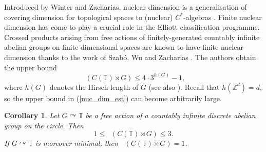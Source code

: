 \documentclass[11pt,a4paper,leqno]{amsart}
\newtheorem{cor}[thm]{Corollary}
\theoremstyle{definition}
\theoremstyle{remark}
\numberwithin{equation}{section}
\theoremstyle{plain}
\DeclareMathOperator{\nucdim}{\dim_{\operatorname{nuc}}}
\newcommand{\Zb}{\mathbb{Z}}
\newcommand{\Tb}{\mathbb{T}}
\begin{document}
Introduced by Winter and Zacharias, nuclear dimension is a generalisation of covering dimension for topological spaces to (nuclear) $C^*$-algebras \cite{WinZac10}. Finite nuclear dimension has come to play a crucial role in the Elliott classification programme. Crossed products arising from free actions of finitely-generated countably infinite abelian groups on finite-dimensional spaces are known to have finite nuclear dimension thanks to the work of Szab\'o, Wu and Zacharias \cite[Corollary 8.6]{SzaWuZac19}. The authors obtain the upper bound 
\begin{equation}
    \nucdim(C(\Tb)\rtimes G) \le 4\cdot 3^{h(G)} - 1, \label{nuc_dim_est}
\end{equation}
where $h(G)$ denotes the Hirsch length of $G$ (see also \cite{Sza15}). Recall that $h(\Zb^d) = d$, so the upper bound in (\ref{nuc_dim_est}) can become arbitrarily large. 
 
\begin{cor}\label{C-nuc}
    Let $G\curvearrowright\Tb$ be a free action of a countably infinite discrete abelian group on the circle. Then 
    \begin{equation*}
        1\le \nucdim(C(\Tb)\rtimes G) \le 3.
    \end{equation*}
	If $G\curvearrowright \Tb$ is moreover minimal, then $\nucdim(C(\Tb)\rtimes G) = 1$. 
\end{cor}
\end{document}
